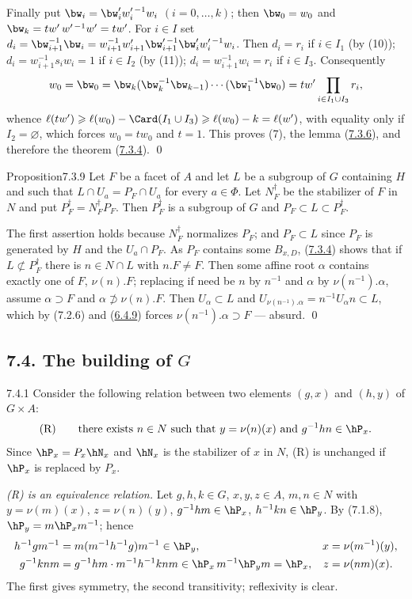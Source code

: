\documentclass[12pt,a4paper,oneside,english]{smfart}
\makeatletter
\newcommand{\btanchor}[1]{\leavevmode\Hy@raisedlink{\hypertarget{bt:#1}{}}}
\newcommand{\btref}[1]{\hyperlink{bt:#1}{#1}}
\newcommand{\btsecB}[2]{%
  \par\needspace{4\baselineskip}\phantomsection
  \subsection*{#2}%
  \ifx\relax#1\relax\else\btanchor{#1}\fi}
\theoremstyle{definition}
\theoremstyle{bt}
\makeatother
\begin{document}
Finally put $\bw_i=\bw'_iw'^{\,-1}_iw_i$ $(i=0,\dots,k)$; then $\bw_0=w_0$ and
$\bw_k=tw'\,w'^{\,-1}w'=tw'$. For $i\in I$ set
$d_i=\bw^{-1}_{i+1}\bw_i=w^{-1}_{i+1}w'_{i+1}\bw'^{\,-1}_{i+1}\bw'_iw'^{\,-1}_iw_i$.
Then $d_i=r_i$ if $i\in I_1$ (by (10)); $d_i=w^{-1}_{i+1}s_iw_i=1$ if $i\in I_2$
(by (11)); $d_i=w^{-1}_{i+1}w_i=r_i$ if $i\in I_3$. Consequently
\[
  w_0=\bw_0=\bw_k(\bw_k^{-1}\bw_{k-1})\cdots(\bw_1^{-1}\bw_0)    =tw'\prod_{i\in I_1\cup I_3}r_i,
\]
whence
$\ell(tw')\geqslant\ell(w_0)-\Card(I_1\cup I_3)\geqslant\ell(w_0)-k=\ell(w')$,
with equality only if $I_2=\varnothing$, which forces $w_0=tw_0$ and $t=1$. This
proves (7), the lemma (\btref{7.3.6}), and therefore the theorem (\btref{7.3.4}). \qed

\begin{stmt}{Proposition}{7.3.9}\btanchor{7.3.9}
Let $F$ be a facet of $A$ and let $L$ be a subgroup of $G$ containing $H$ and such
that $L\cap U_a=P_F\cap U_a$ for every $a\in\Phi$. Let $N_F^{\dagger}$ be the
stabilizer of $F$ in $N$ and put $P_F^{\dagger}=N_F^{\dagger}P_F$. Then
$P_F^{\dagger}$ is a subgroup of $G$ and
$P_F\subset L\subset P_F^{\dagger}$.
\end{stmt}

\pf The first assertion holds because $N_F^{\dagger}$ normalizes $P_F$; and
$P_F\subset L$ since $P_F$ is generated by $H$ and the $U_a\cap P_F$. As $P_F$
contains some $B_{x,D}$, (\btref{7.3.4}) shows that if $L\not\subset P_F^{\dagger}$ there is
$n\in N\cap L$ with $n.F\neq F$. Then some affine root $\alpha$ contains exactly one
of $F$, $\nu(n).F$; replacing if need be $n$ by $n^{-1}$ and $\alpha$ by
$\nu(n^{-1}).\alpha$, assume $\alpha\supset F$ and $\alpha\not\supset\nu(n).F$. Then
$U_\alpha\subset L$ and $U_{\nu(n^{-1}).\alpha}=n^{-1}U_\alpha n\subset L$, which by
(7.2.6) and (\btref{6.4.9}) forces $\nu(n^{-1}).\alpha\supset F$ --- absurd. \qed

\btsecB{7.4}{7.4. The building of \texorpdfstring{$G$}{G}}

\num{7.4.1}\btanchor{7.4.1} Consider the following relation between two elements $(g,x)$ and $(h,y)$
of $G\times A$:
\[
  \text{(R)}\qquad
  \text{there exists }n\in N\text{ such that } y=\nu(n)(x)\text{ and }
  g^{-1}hn\in\hP_x .
\]
Since $\hP_x=P_x\hN_x$ and $\hN_x$ is the stabilizer of $x$ in $N$, (R) is
unchanged if $\hP_x$ is replaced by $P_x$.

\emph{(R) is an equivalence relation.} Let $g,h,k\in G$, $x,y,z\in A$, $m,n\in N$
with $y=\nu(m)(x)$, $z=\nu(n)(y)$, $g^{-1}hm\in\hP_x$, $h^{-1}kn\in\hP_y$. By
(7.1.8), $\hP_y=m\hP_xm^{-1}$; hence
\begin{align*}
  h^{-1}gm^{-1}&=m(m^{-1}h^{-1}g)m^{-1}\in\hP_y, & x&=\nu(m^{-1})(y),\\
  g^{-1}knm&=g^{-1}hm\cdot m^{-1}h^{-1}knm\in\hP_x\,m^{-1}\hP_ym=\hP_x, & z&=\nu(nm)(x).
\end{align*}
The first gives symmetry, the second transitivity; reflexivity is clear.
\end{document}
